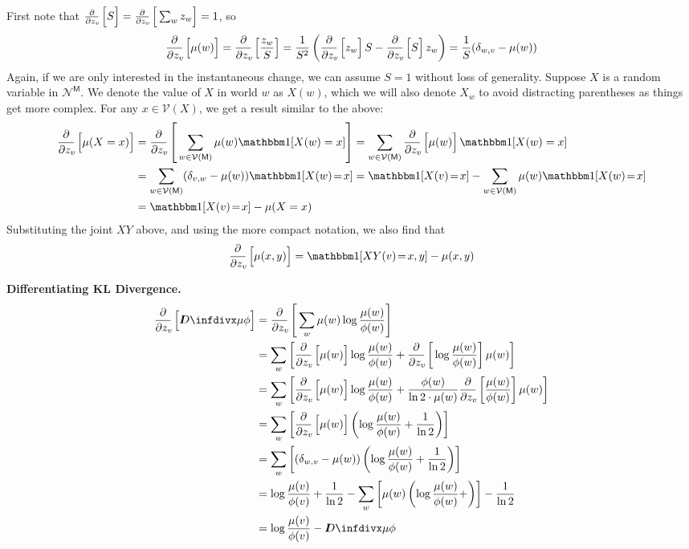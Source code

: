 \documentclass{article}
\newcommand{\V}{\mathcal V}
\newcommand{\N}{\mathcal N}
\newcommand{\sfM}{\mathsf M}
\begin{document}
	First note that $\pz{S} = \pz{\sum_w z_w} = 1$, so
	\[ \pz{\mu(w)} = \pz{\frac{z_w}{S}} 
		= \frac{1}{S^2} \left(\pz{z_w} {S} - \pz{S}z_w \right) 
		= \frac{1}{S}(\delta_{w,v} - \mu(w))
	\]
	Again, if we are only interested in the instantaneous change, we can assume $S = 1$ without loss of generality.
	Suppose $X$ is a random variable in $\N^\sfM$. We denote the value of $X$ in world $w$ as $X(w)$, which we will also denote $X_w$ to avoid distracting parentheses as things get more complex. For any $x \in \V(X)$, we get a result similar to the above:
	\begin{align*} \pz{\mu(X = x)}
	  	&= \pz{\sum_{w \in \V(\sfM)} \mu(w) \mathbbm1[X(w) = x]}
	 	= \sum_{w \in \V(\sfM)} \pz{\mu(w)} \mathbbm1[X(w) = x] \\
	 	&= \sum_{w \in \V(\sfM)} (\delta_{v,w} - \mu(w)) \mathbbm1[X(w) \!=\! x]
	 	= \mathbbm1[X(v) \!=\! x] - \sum_{w \in \V(\sfM)} \mu(w) \mathbbm1[X(w) \!=\! x] \\
	 	&=  \mathbbm1[X(v) \!=\! x]  - \mu(X = x)
	\end{align*}
	Substituting the joint $XY$ above, and using the more compact notation, we also find that
	\[ \pz{\mu(x,y)} = \mathbbm1[XY(v) \!=\! x,y] - \mu(x,y) \] 
	
	\textbf{Differentiating KL Divergence.}
	\begin{align*}
		\pz{\kldiv{\mu}{\phi}} &= \pz{\sum_w \mu(w) \log \frac{\mu(w)}{\phi(w)}} \\
			&= \sum_w \left[ \pz{\mu(w)} \log \frac{\mu(w)}{\phi(w)} + \pz{\log\frac{\mu(w)}{\phi(w)} }\mu(w) \right] \\
			&=\sum_w \left[ \pz{\mu(w)} \log \frac{\mu(w)}{\phi(w)} + \frac{\phi(w)}{\ln 2\cdot\mu(w)} \pz{\frac{\mu(w)}{\phi(w)}} \mu(w) \right] \\
			&=\sum_w \left[ \pz{\mu(w)} \left(\log \frac{\mu(w)}{\phi(w)} + \frac{1}{\ln 2} \right) \right] \\
			&=\sum_w \left[ (\delta_{w,v} - \mu(w)) \left(\log \frac{\mu(w)}{\phi(w)} + \frac{1}{\ln 2} \right) \right] \\
			&= \log \frac{\mu(v)}{\phi(v)} + \frac{1}{\ln 2} - \sum_w \left[ \mu(w) \left(\log \frac{\mu(w)}{\phi(w)} +  \right) \right] - \frac{1}{\ln 2} \\
			&= \log \frac{\mu(v)}{\phi(v)} - \kldiv{\mu}{\phi} \\
	\end{align*}
	
\end{document}
